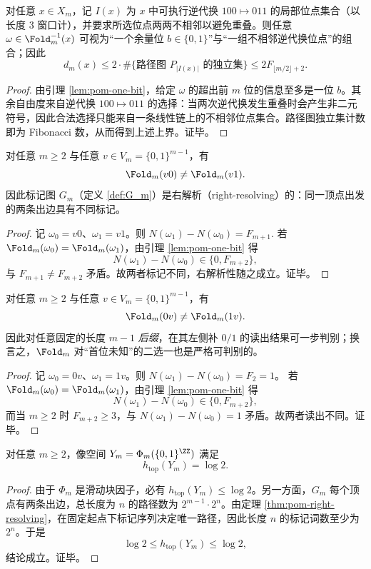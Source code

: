 \begin{proposition}[纤维自由度的二层分解]\label{prop:pom-fiber-decompose}
对任意 $x\in X_m$，记 $I(x)$ 为 $x$ 中可执行逆代换 $100\mapsto 011$ 的局部位点集合（以长度 $3$ 窗口计），并要求所选位点两两不相邻以避免重叠。则任意 $\omega\in\Fold_m^{-1}(x)$ 可视为“一个余量位 $b\in\{0,1\}$”与“一组不相邻逆代换位点”的组合；因此
\[
d_m(x)\le 2\cdot \#\{\text{路径图 }P_{|I(x)|}\text{ 的独立集}\}
\le 2F_{\lfloor m/2\rfloor+2}.
\]
\end{proposition}
\begin{proof}
由引理 \ref{lem:pom-one-bit}，给定 $\omega$ 的超出前 $m$ 位的信息至多是一位 $b$。其余自由度来自逆代换 $100\mapsto 011$ 的选择：当两次逆代换发生重叠时会产生非二元符号，因此合法选择只能来自一条线性链上的不相邻位点集合。路径图独立集计数即为 Fibonacci 数，从而得到上述上界。证毕。
\end{proof}

\begin{theorem}[一步可判别与右解析性]\label{thm:pom-right-resolving}
对任意 $m\ge 2$ 与任意 $v\in V_m=\{0,1\}^{m-1}$，有
\[
\Fold_m(v0)\neq \Fold_m(v1).
\]
因此标记图 $G_m$（定义 \ref{def:G_m}）是右解析（right-resolving）的：同一顶点出发的两条出边具有不同标记。
\end{theorem}
\begin{proof}
记 $\omega_0=v0$、$\omega_1=v1$。则 $N(\omega_1)-N(\omega_0)=F_{m+1}$. 若 $\Fold_m(\omega_0)=\Fold_m(\omega_1)$，由引理 \ref{lem:pom-one-bit} 得
\[
N(\omega_1)-N(\omega_0)\in\{0,F_{m+2}\},
\]
与 $F_{m+1}\neq F_{m+2}$ 矛盾。故两者标记不同，右解析性随之成立。证毕。
\end{proof}

\begin{theorem}[一步可判别与左解析性]\label{thm:pom-left-resolving}
对任意 $m\ge 2$ 与任意 $v\in V_m=\{0,1\}^{m-1}$，有
\[
\Fold_m(0v)\neq \Fold_m(1v).
\]
因此对任意固定的长度 $m-1$ \emph{后缀}，在其左侧补 $0/1$ 的读出结果可一步判别；换言之，$\Fold_m$ 对“首位未知”的二选一也是严格可判别的。
\end{theorem}
\begin{proof}
记 $\omega_0=0v$、$\omega_1=1v$。则 $N(\omega_1)-N(\omega_0)=F_2=1$。
若 $\Fold_m(\omega_0)=\Fold_m(\omega_1)$，由引理 \ref{lem:pom-one-bit} 得
\[
N(\omega_1)-N(\omega_0)\in\{0,F_{m+2}\},
\]
而当 $m\ge 2$ 时 $F_{m+2}\ge 3$，与 $N(\omega_1)-N(\omega_0)=1$ 矛盾。故两者读出不同。证毕。
\end{proof}

\begin{theorem}\label{thm:pom-entropy-saturation}
对任意 $m\ge 2$，像空间 $Y_m=\Phi_m(\{0,1\}^{\ZZ})$ 满足
\[
h_{\mathrm{top}}(Y_m)=\log 2.
\]
\end{theorem}
\begin{proof}
由于 $\Phi_m$ 是滑动块因子，必有 $h_{\mathrm{top}}(Y_m)\le \log 2$。另一方面，$G_m$ 每个顶点有两条出边，总长度为 $n$ 的路径数为 $2^{m-1}\cdot 2^{n}$。由定理 \ref{thm:pom-right-resolving}，在固定起点下标记序列决定唯一路径，因此长度 $n$ 的标记词数至少为 $2^{n}$。于是
\[
\log 2\le h_{\mathrm{top}}(Y_m)\le \log 2,
\]
结论成立。证毕。
\end{proof}

